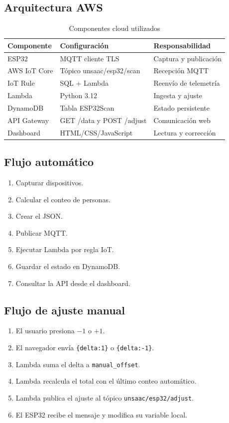 \documentclass[12pt,a4paper]{article}
\begin{document}
\subsection{Arquitectura AWS}
\begin{table}[htbp]
\centering
\centering
\caption{Componentes cloud utilizados}
\begin{tabularx}{\textwidth}{@{}p{3cm}p{4.3cm}X@{}}
\toprule
Componente & Configuración & Responsabilidad \\
\midrule
ESP32 & MQTT cliente TLS & Captura y publicación \\
AWS IoT Core & Tópico unsaac/esp32/scan & Recepción MQTT \\
IoT Rule & SQL + Lambda & Reenvío de telemetría \\
Lambda & Python 3.12 & Ingesta y ajuste \\
DynamoDB & Tabla ESP32Scan & Estado persistente \\
API Gateway & GET /data y POST /adjust & Comunicación web \\
Dashboard & HTML/CSS/JavaScript & Lectura y corrección \\
\bottomrule
\end{tabularx}
\end{table}

\subsection{Flujo automático}
\begin{enumerate}
\item Capturar dispositivos.
\item Calcular el conteo de personas.
\item Crear el JSON.
\item Publicar MQTT.
\item Ejecutar Lambda por regla IoT.
\item Guardar el estado en DynamoDB.
\item Consultar la API desde el dashboard.
\end{enumerate}

\subsection{Flujo de ajuste manual}
\begin{enumerate}
\item El usuario presiona $-1$ o $+1$.
\item El navegador envía \texttt{\{delta:1\}} o \texttt{\{delta:-1\}}.
\item Lambda suma el delta a \texttt{manual\_offset}.
\item Lambda recalcula el total con el último conteo automático.
\item Lambda publica el ajuste al tópico \texttt{unsaac/esp32/adjust}.
\item El ESP32 recibe el mensaje y modifica su variable local.
\end{enumerate}
\end{document}
